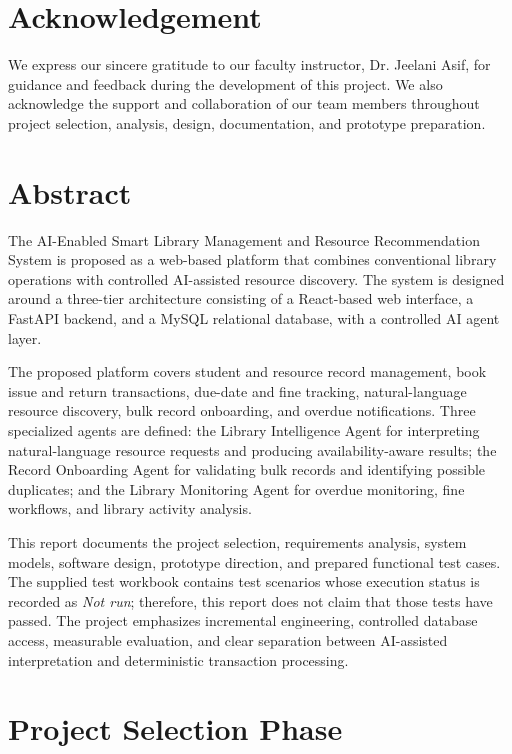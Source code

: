 \documentclass[12pt,a4paper]{report}
\begin{document}
\chapter*{Acknowledgement}
We express our sincere gratitude to our faculty instructor, Dr. Jeelani Asif, for guidance and feedback during the development of this project. We also acknowledge the support and collaboration of our team members throughout project selection, analysis, design, documentation, and prototype preparation.

\chapter*{Abstract}
The AI-Enabled Smart Library Management and Resource Recommendation System is proposed as a web-based platform that combines conventional library operations with controlled AI-assisted resource discovery. The system is designed around a three-tier architecture consisting of a React-based web interface, a FastAPI backend, and a MySQL relational database, with a controlled AI agent layer.

The proposed platform covers student and resource record management, book issue and return transactions, due-date and fine tracking, natural-language resource discovery, bulk record onboarding, and overdue notifications. Three specialized agents are defined: the Library Intelligence Agent for interpreting natural-language resource requests and producing availability-aware results; the Record Onboarding Agent for validating bulk records and identifying possible duplicates; and the Library Monitoring Agent for overdue monitoring, fine workflows, and library activity analysis.

This report documents the project selection, requirements analysis, system models, software design, prototype direction, and prepared functional test cases. The supplied test workbook contains test scenarios whose execution status is recorded as \textit{Not run}; therefore, this report does not claim that those tests have passed. The project emphasizes incremental engineering, controlled database access, measurable evaluation, and clear separation between AI-assisted interpretation and deterministic transaction processing.

\tableofcontents
\listoffigures
\listoftables
\clearpage
{}

\chapter{Project Selection Phase}
\end{document}
